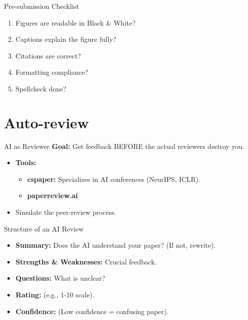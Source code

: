 \documentclass[aspectratio=169]{beamer}
\begin{document}
\begin{frame}[t]{Pre-submission Checklist}
    \begin{enumerate}
        \item Figures are readable in Black \& White?
        \item Captions explain the figure fully?
        \item Citations are correct?
        \item Formatting compliance?
        \item Spellcheck done?
    \end{enumerate}
\end{frame}


\section{Auto-review}

\begin{frame}[t]{AI as Reviewer}
    \textbf{Goal:} Get feedback BEFORE the actual reviewers destroy you.
    \vspace{0.5cm}
    \begin{itemize}
        \item \textbf{Tools:}
        \begin{itemize}
            \item \textbf{cspaper:} Specializes in AI conferences (NeurIPS, ICLR).
            \item \textbf{paperreview.ai}
        \end{itemize}
        \item Simulate the peer-review process.
    \end{itemize}
\end{frame}

\begin{frame}[t]{Structure of an AI Review}
    \begin{itemize}
        \item \textbf{Summary:} Does the AI understand your paper? (If not, rewrite).
        \item \textbf{Strengths \& Weaknesses:} Crucial feedback.
        \item \textbf{Questions:} What is unclear?
        \item \textbf{Rating:} (e.g., 1-10 scale).
        \item \textbf{Confidence:} (Low confidence = confusing paper).
    \end{itemize}
\end{frame}
\end{document}
